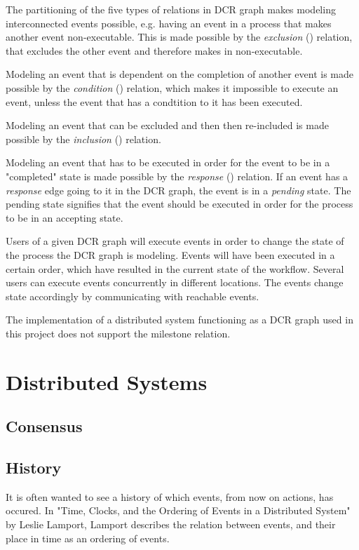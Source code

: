 	The partitioning of the five types of relations in DCR graph makes modeling interconnected events possible, e.g. having an event in a process that makes another event non-executable. This is made possible by the \textit{exclusion} (\exclusion) relation, that excludes the other event and therefore makes in non-executable. 
	
	Modeling an event that is dependent on the completion of another event is made possible by the \textit{condition} (\condition) relation, which makes it impossible to execute an event, unless the event that has a condtition to it has been executed.
	
	Modeling an event that can be excluded and then then re-included is made possible by the \textit{inclusion} (\inclusion) relation. 
	
	Modeling an event that has to be executed in order for the event to be in a "completed" state  is made possible by the \textit{response} (\response) relation. If an event has a \textit{response} edge going to it in the DCR graph, the event is in a \textit{pending} state. The pending state signifies that the event should be executed in order for the process to be in an accepting state.
	
	Users of a given DCR graph will execute events in order to change the state of the process the DCR graph is modeling. Events will have been executed in a certain order, which have resulted in the current state of the workflow. Several users can execute events concurrently in different locations. The events change state accordingly by communicating with reachable events. 
	
	The implementation of a distributed system functioning as a DCR graph used in this project does not support the milestone relation. 
	\section{Distributed Systems}
		\subsection{Consensus}
		\subsection{History}
		It is often wanted to see a history of which events, from now on actions, has occured. In "Time, Clocks, and the Ordering of Events in a Distributed System" by Leslie Lamport, Lamport describes the relation between events, and their place in time as an ordering of events. 
		
